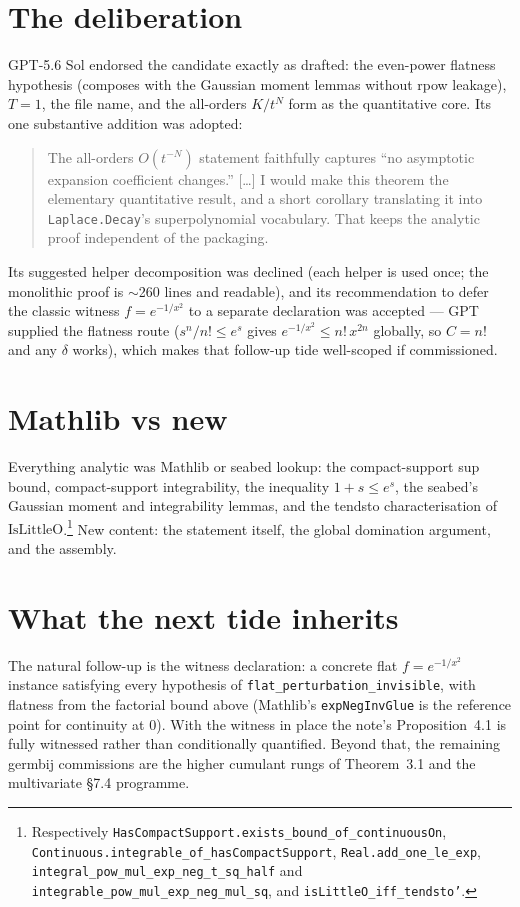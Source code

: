 \documentclass[11pt]{article}
\begin{document}
\section{The deliberation}

GPT-5.6 Sol endorsed the candidate exactly as drafted: the even-power
flatness hypothesis (composes with the Gaussian moment lemmas without
rpow leakage), $T = 1$, the file name, and the all-orders $K/t^N$ form
as the quantitative core. Its one substantive addition was adopted:
\begin{quote}
The all-orders $O(t^{-N})$ statement faithfully captures ``no
asymptotic expansion coefficient changes.'' [\dots] I would make this
theorem the elementary quantitative result, and a short corollary
translating it into \texttt{Laplace.Decay}'s superpolynomial
vocabulary. That keeps the analytic proof independent of the
packaging.
\end{quote}
Its suggested helper decomposition was declined (each helper is used
once; the monolithic proof is $\sim$260 lines and readable), and its
recommendation to defer the classic witness $f = e^{-1/x^2}$ to a
separate declaration was accepted --- GPT supplied the flatness route
($s^n/n! \le e^s$ gives $e^{-1/x^2} \le n!\,x^{2n}$ globally, so
$C = n!$ and any $\delta$ works), which makes that follow-up tide
well-scoped if commissioned.

\section{Mathlib vs new}

Everything analytic was Mathlib or seabed lookup: the compact-support
sup bound, compact-support integrability, the inequality
$1 + s \le e^s$, the seabed's Gaussian moment and integrability
lemmas, and the tendsto characterisation of
$\mathrm{IsLittleO}$.\footnote{Respectively
\texttt{HasCompactSupport.}\allowbreak\texttt{exists\_bound\_of\_continuousOn},
\texttt{Continuous.}\allowbreak\texttt{integrable\_of\_hasCompactSupport},
\texttt{Real.add\_one\_le\_exp},
\texttt{integral\_pow\_mul\_exp\_neg\_t\_sq\_half} and
\texttt{integrable\_pow\_mul\_exp\_neg\_mul\_sq}, and
\texttt{isLittleO\_iff\_tendsto'}.} New content: the statement itself,
the global domination argument, and the assembly.

\section{What the next tide inherits}

The natural follow-up is the witness declaration: a concrete flat
$f = e^{-1/x^2}$ instance satisfying every hypothesis of
\texttt{flat\_perturbation\_invisible}, with flatness from the
factorial bound above (Mathlib's \texttt{expNegInvGlue} is the
reference point for continuity at $0$). With the witness in place the
note's Proposition~4.1 is fully witnessed rather than conditionally
quantified. Beyond that, the remaining germbij commissions are the
higher cumulant rungs of Theorem~3.1 and the multivariate \S7.4
programme.
\end{document}
